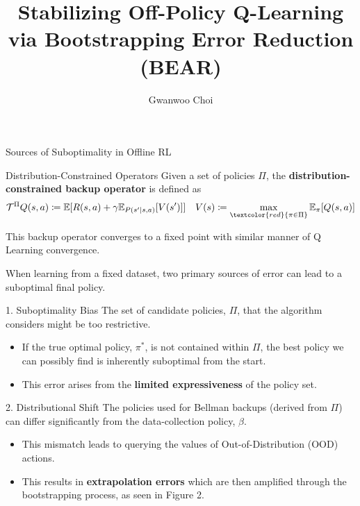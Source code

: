 \documentclass[11pt]{beamer}
\title{Stabilizing Off-Policy Q-Learning via Bootstrapping Error Reduction (BEAR)}
\author{Gwanwoo Choi}
\institute{MLIC}
\date{} %
\newcommand{\mbb}[1]{\mathbb{#1}}
\newcommand{\mc}[1]{\mathcal{#1}}
\newcommand{\tb}[1]{\textbf{#1}}
\begin{document}
\begin{frame}
    \titlepage
\end{frame}

\begin{frame}{Sources of Suboptimality in Offline RL}
    \begin{block}{Distribution-Constrained Operators}
        Given a set of policies $\Pi$, the \tb{distribution-constrained backup operator} is defined as
        \[
            \mc{T}^\Pi Q(s,a) \coloneqq \mbb{E}[R(s,a) + \gamma \mbb{E}_{P(s^\prime|s,a)}[V(s^\prime)]] \quad V(s) \coloneqq \max_{\textcolor{red}{\pi \in \Pi}} \mbb{E}_{\pi}[Q(s,a)]
        \]

        This backup operator converges to a fixed point with similar manner of Q Learning convergence.
    \end{block}

    \vspace{0.5cm}
    When learning from a fixed dataset, two primary sources of error can lead to a suboptimal final policy.

    \begin{block}{1. Suboptimality Bias}
        The set of candidate policies, $\Pi$, that the algorithm considers might be too restrictive.
        \begin{itemize}
            \item If the true optimal policy, $\pi^*$, is not contained within $\Pi$, the best policy we can possibly find is inherently suboptimal from the start.
            \item This error arises from the \tb{limited expressiveness} of the policy set.
        \end{itemize}
    \end{block}

    \begin{block}{2. Distributional Shift}
        The policies used for Bellman backups (derived from $\Pi$) can differ significantly from the data-collection policy, $\beta$.
        \begin{itemize}
            \item This mismatch leads to querying the values of Out-of-Distribution (OOD) actions.
            \item This results in \tb{extrapolation errors} which are then amplified through the bootstrapping process, as seen in Figure 2.
        \end{itemize}
    \end{block}
\end{frame}
\end{document}
